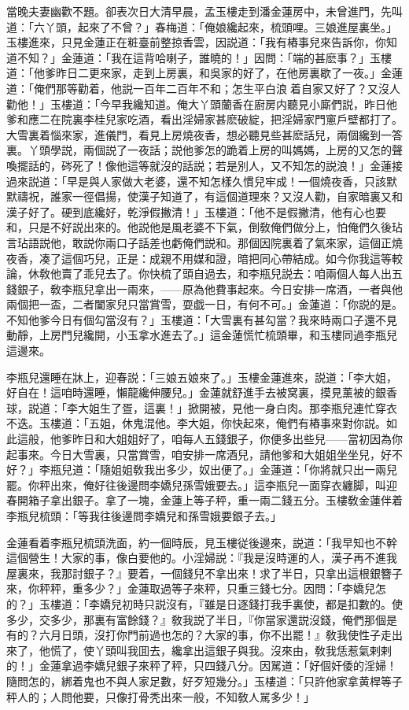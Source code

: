 當晚夫妻幽歡不題。卻表次日大清早晨，孟玉樓走到潘金蓮房中，未曾進門，先叫道：「六丫頭，起來了不曾？」春梅道：「俺娘纔起來，梳頭哩。三娘進屋裏坐。」玉樓進來，只見金蓮正在粧臺前整掠香雲，因説道：「我有樁事兒來告訴你，你知道不知？」金蓮道：「我在這背哈喇子，誰曉的！」因問：「端的甚麽事？」玉樓道：「他爹昨日二更來家，走到上房裏，和吳家的好了，在他房裏歇了一夜。」金蓮道：「俺們那等勸着，他説一百年二百年不和；怎生平白浪𢵞着自家又好了？又沒人勸他！」玉樓道：「今早我纔知道。俺大丫頭蘭香在廚房内聽見小廝們説，昨日他爹和應二在院裏李桂兒家吃酒，看出淫婦家甚麽破綻，把淫婦家門窻戶壁都打了。大雪裏着惱來家，進儀門，看見上房燒夜香，想必聽見些甚麽話兒，兩個纔到一答裏。丫頭學説，兩個説了一夜話；説他爹怎的跪着上房的叫媽媽，上房的又怎的聲喚擺話的，硶死了！像他這等就沒的話説；若是別人，又不知怎的説浪！」金蓮接過來説道：「早是與人家做大老婆，還不知怎樣久慣兒牢成！一個燒夜香，只該默默禱祝，誰家一徑倡揚，使漢子知道了，有這個道理來？又沒人勸，自家暗裏又和漢子好了。硬到底纔好，乾淨假撇清！」玉樓道：「他不是假撇清，他有心也要和，只是不好説出來的。他説他是風老婆不下氣，倒敎俺們做分上，怕俺們久後玷言玷語説他，敢説你兩口子話差也虧俺們説和。那個因院裏着了氣來家，這個正燒夜香，凑了這個巧兒，正是：成親不用媒和證，暗把同心帶結成。如今你我這等較論，休敎他賣了乖兒去了。你快梳了頭自過去，和李瓶兒説去：咱兩個人每人出五錢銀子，敎李瓶兒拿出一兩來，——原為他費事起來。今日安排一席酒，一者與他兩個把一盃，二者闔家兒只當賞雪，耍戯一日，有何不可。」金蓮道：「你説的是。不知他爹今日有個勾當沒有？」玉樓道：「大雪裏有甚勾當？我來時兩口子還不見動靜，上房門兒纔開，小玉拿水進去了。」這金蓮慌忙梳頭畢，和玉樓同過李瓶兒這邊來。

李瓶兒還睡在牀上，迎春説：「三娘五娘來了。」玉樓金蓮進來，説道：「李大姐，好自在！這咱時還睡，懶龍纔伸腰兒。」金蓮就舒進手去被窝裏，摸見薰被的銀香球，説道：「李大姐生了疍，這裏！」掀開被，見他一身白肉。那李瓶兒連忙穿衣不迭。玉樓道：「五姐，休鬼混他。李大姐，你快起來，俺們有樁事來對你説。如此這般，他爹昨日和大姐姐好了，咱每人五錢銀子，你便多出些兒——當初因為你起事來。今日大雪裏，只當賞雪，咱安排一席酒兒，請他爹和大姐姐坐坐兒，好不好？」李瓶兒道：「隨姐姐敎我出多少，奴出便了。」金蓮道：「你將就只出一兩兒罷。你秤出來，俺好往後邊問李嬌兒孫雪娥要去。」這李瓶兒一面穿衣纏脚，叫迎春開箱子拿出銀子。拿了一塊，金蓮上等子秤，重一兩二錢五分。玉樓敎金蓮伴着李瓶兒梳頭：「等我往後邊問李嬌兒和孫雪娥要銀子去。」

金蓮看着李瓶兒梳頭洗面，約一個時辰，見玉樓従後邊來，説道：「我早知也不幹這個營生！大家的事，像白要他的。小淫婦説：『我是沒時運的人，漢子再不進我屋裏來，我那討銀子？』要着，一個錢兒不拿出來！求了半日，只拿出這根銀簪子來，你秤秤，重多少？」金蓮取過等子來秤，只重三錢七分。因問：「李嬌兒怎的？」玉樓道：「李嬌兒初時只説沒有，『雖是日逐錢打我手裏使，都是扣數的。使多少，交多少，那裏有富餘錢？』敎我説了半日，『你當家還説沒錢，俺們那個是有的？六月日頭，沒打你門前過也怎的？大家的事，你不出罷！』敎我使性子走出來了，他慌了，使丫頭叫我囬去，纔拿出這銀子與我。沒來由，敎我恁惹氣剌剌的！」金蓮拿過李嬌兒銀子來秤了秤，只四錢八分。因駡道：「好個奸倭的淫婦！隨問怎的，綁着鬼也不與人家足數，好歹短幾分。」玉樓道：「只許他家拿黄桿等子秤人的；人問他要，只像打骨秃出來一般，不知敎人駡多少！」

